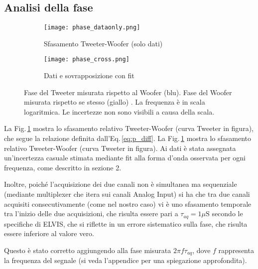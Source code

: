 \documentclass[../Relazione_circuiti]{subfiles}
\begin{document}
\subsection{Analisi della fase}

  \begin{figure}[H]
    \centering

    \begin{subfigure}{=0.49\textwidth}
      \centering
      \texttt{[image: phase\_dataonly.png]}
      \caption{Sfasamento Tweeter-Woofer (solo dati)}
      \label{fig: pdiff_dataonly}

    \end{subfigure}
    \hfill
    \begin{subfigure}{=0.49\textwidth}
      \centering
      \texttt{[image: phase\_cross.png]}
      \caption{Dati e sovrapposizione con fit}
      \label{fig: pdiff_fit_data}

    \end{subfigure}

    \caption{Fase del Tweeter misurata rispetto al Woofer (blu). Fase del Woofer misurata rispetto se stesso (giallo)
      . La frequenza è in scala logaritmica. Le incertezze non sono visibili a causa della scala.}
    \label{fig: phase_diff}

  \end{figure}

  La Fig.\,\ref{fig: pdiff_dataonly} mostra lo sfasamento relativo Tweeter-Woofer (curva Tweeter in figura), che segue la
  relazione definita dall'Eq.\,\eqref{eq:p_diff}.
  La Fig.\,\ref{fig: pdiff_dataonly} mostra lo sfasamento relativo Tweeter-Woofer (curva Tweeter in figura).
  Ai dati è stata assegnata un'incertezza casuale stimata mediante fit alla forma d'onda osservata per ogni frequenza,
  come descritto in sezione 2.  
  
Inoltre, poiché l'acquisizione dei due canali non è simultanea ma sequenziale (mediante multiplexer che itera sui
  canali Analog Input) si ha che tra due canali acquisiti consecutivamente (come nel nostro caso) vi è uno sfasamento
  temporale tra l'inizio delle due acquisizioni, che risulta essere pari a $\tau_{aq}=1 \mu \mathrm{S}$
      secondo le specifiche di ELVIS, che si riflette in un errore sistematico sulla fase, che risulta essere inferiore
      al valore vero.

      Questo è stato corretto aggiungendo alla fase misurata  $ 2 \pi f \tau_{aq}$, dove $f$
      rappresenta la frequenza del segnale (si veda l'appendice per una spiegazione approfondita).
\end{document}
